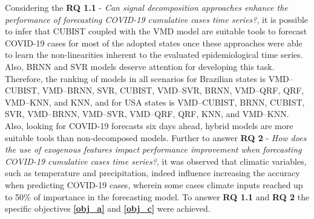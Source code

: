 Considering the \textbf{RQ 1.1} - \textit{Can signal decomposition approaches enhance the performance of forecasting \ac{COVID-19} cumulative cases time series?}, it is possible to infer that \ac{CUBIST} coupled with the \ac{VMD} model are suitable tools to forecast \ac{COVID-19} cases for most of the adopted states once these approaches were able to learn the non-linearities inherent to the evaluated epidemiological time series. Also, \ac{BRNN} and \ac{SVR} models deserve attention for developing this task. Therefore, the ranking of models in all scenarios for Brazilian states is \ac{VMD}--\ac{CUBIST}, \ac{VMD}--\ac{BRNN}, \ac{SVR}, \ac{CUBIST}, \ac{VMD}--\ac{SVR}, \ac{BRNN}, \ac{VMD}--\ac{QRF}, \ac{QRF}, \ac{VMD}--\ac{KNN}, and \ac{KNN}, and for \ac{USA} states is \ac{VMD}--\ac{CUBIST}, \ac{BRNN}, \ac{CUBIST}, \ac{SVR}, \ac{VMD}--\ac{BRNN}, \ac{VMD}--\ac{SVR}, \ac{VMD}--\ac{QRF}, \ac{QRF}, \ac{KNN}, and \ac{VMD}--\ac{KNN}. Also, looking for \ac{COVID-19} forecasts six days ahead, hybrid models are more suitable tools than non-decomposed models. Further to answer \textbf{RQ 2} - \textit{How does the use of exogenous features impact performance improvement when forecasting \ac{COVID-19} cumulative cases time series?}, it was observed that climatic variables, such as temperature and precipitation, indeed influence increasing the accuracy when predicting \ac{COVID-19} cases, wherein some cases climate inputs reached up to 50\% of importance in the forecasting model. To answer \textbf{RQ 1.1} and \textbf{RQ 2} the specific objectives \textbf{\ref{obj_a}} and \textbf{\ref{obj_c}} were achieved.